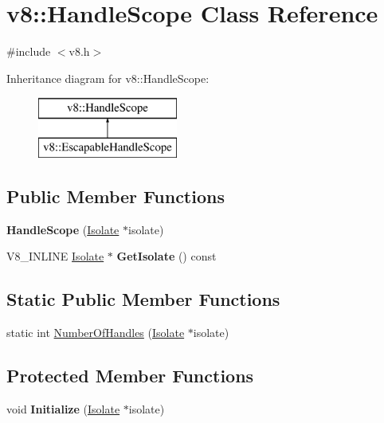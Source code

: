 \hypertarget{classv8_1_1_handle_scope}{}\section{v8\+:\+:Handle\+Scope Class Reference}
\label{classv8_1_1_handle_scope}


{\ttfamily \#include $<$v8.\+h$>$}

Inheritance diagram for v8\+:\+:Handle\+Scope\+:\begin{figure}[H]
\begin{center}
\leavevmode
\includegraphics[height=2.000000cm]{classv8_1_1_handle_scope}
\end{center}
\end{figure}
\subsection*{Public Member Functions}
\begin{DoxyCompactItemize}
\item 
{\bfseries Handle\+Scope} (\hyperlink{classv8_1_1_isolate}{Isolate} $\ast$isolate)\hypertarget{classv8_1_1_handle_scope_afdb3053d852ea467f026b025ed431e79}{}\label{classv8_1_1_handle_scope_afdb3053d852ea467f026b025ed431e79}

\item 
V8\+\_\+\+I\+N\+L\+I\+NE \hyperlink{classv8_1_1_isolate}{Isolate} $\ast$ {\bfseries Get\+Isolate} () const \hypertarget{classv8_1_1_handle_scope_a15d1a1e76d8cd8a10d3947c3ca2e8a8d}{}\label{classv8_1_1_handle_scope_a15d1a1e76d8cd8a10d3947c3ca2e8a8d}

\end{DoxyCompactItemize}
\subsection*{Static Public Member Functions}
\begin{DoxyCompactItemize}
\item 
static int \hyperlink{classv8_1_1_handle_scope_abab7214c9b9388b02f575fd5270b7e2f}{Number\+Of\+Handles} (\hyperlink{classv8_1_1_isolate}{Isolate} $\ast$isolate)
\end{DoxyCompactItemize}
\subsection*{Protected Member Functions}
\begin{DoxyCompactItemize}
\item 
void {\bfseries Initialize} (\hyperlink{classv8_1_1_isolate}{Isolate} $\ast$isolate)\hypertarget{classv8_1_1_handle_scope_a7bb8631c1c8756b05e9232b8414dd992}{}\label{classv8_1_1_handle_scope_a7bb8631c1c8756b05e9232b8414dd992}

\end{DoxyCompactItemize}

